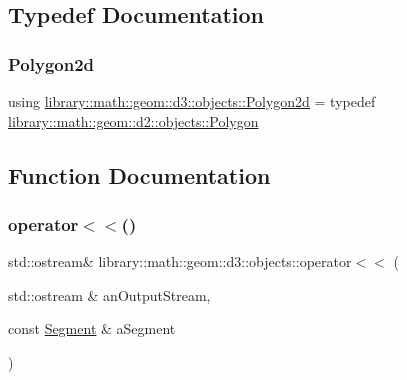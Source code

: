 \subsection{Typedef Documentation}
\mbox{\label{namespacelibrary_1_1math_1_1geom_1_1d3_1_1objects_ae339035ccf9a6f4f0d2945fdcfd76f95}} 
\subsubsection{\texorpdfstring{Polygon2d}{Polygon2d}}
{\footnotesize\ttfamily using \hyperlink{namespacelibrary_1_1math_1_1geom_1_1d3_1_1objects_ae339035ccf9a6f4f0d2945fdcfd76f95}{library\+::math\+::geom\+::d3\+::objects\+::\+Polygon2d} = typedef \hyperlink{classlibrary_1_1math_1_1geom_1_1d2_1_1objects_1_1_polygon}{library\+::math\+::geom\+::d2\+::objects\+::\+Polygon}}



\subsection{Function Documentation}
\mbox{\label{namespacelibrary_1_1math_1_1geom_1_1d3_1_1objects_a6ebfe5087caa91d080eb4b84a625ae87}} 
\subsubsection{\texorpdfstring{operator$<$$<$()}{operator<<()}\hspace{0.1cm}{\footnotesize\ttfamily [1/4]}}
{\footnotesize\ttfamily std\+::ostream\& library\+::math\+::geom\+::d3\+::objects\+::operator$<$$<$ (\begin{DoxyParamCaption}\item[{std\+::ostream \&}]{an\+Output\+Stream,  }\item[{const \hyperlink{classlibrary_1_1math_1_1geom_1_1d3_1_1objects_1_1_segment}{Segment} \&}]{a\+Segment }\end{DoxyParamCaption})}


